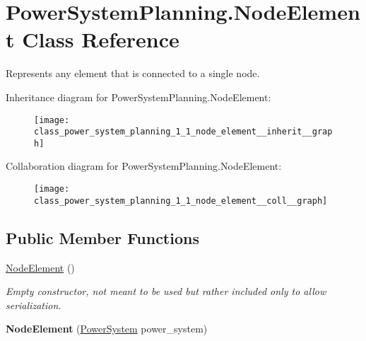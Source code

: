 \hypertarget{class_power_system_planning_1_1_node_element}{}\section{Power\+System\+Planning.\+Node\+Element Class Reference}
\label{class_power_system_planning_1_1_node_element}


Represents any element that is connected to a single node.  




Inheritance diagram for Power\+System\+Planning.\+Node\+Element\+:\nopagebreak
\begin{figure}[H]
\begin{center}
\leavevmode
\texttt{[image: class\_power\_system\_planning\_1\_1\_node\_element\_\_inherit\_\_graph]}
\end{center}
\end{figure}


Collaboration diagram for Power\+System\+Planning.\+Node\+Element\+:\nopagebreak
\begin{figure}[H]
\begin{center}
\leavevmode
\texttt{[image: class\_power\_system\_planning\_1\_1\_node\_element\_\_coll\_\_graph]}
\end{center}
\end{figure}
\subsection*{Public Member Functions}
\begin{DoxyCompactItemize}
\item 
\hyperlink{class_power_system_planning_1_1_node_element_ab6f2652d513f4c2395586e51b3bdacca}{Node\+Element} ()
\begin{DoxyCompactList}\small\item\em Empty constructor, not meant to be used but rather included only to allow serialization. \end{DoxyCompactList}\item 
{\bfseries Node\+Element} (\hyperlink{class_power_system_planning_1_1_power_system}{Power\+System} power\+\_\+system)\hypertarget{class_power_system_planning_1_1_node_element_af98f605241d05e91e17c659b8b511813}{}\label{class_power_system_planning_1_1_node_element_af98f605241d05e91e17c659b8b511813}

\end{DoxyCompactItemize}
